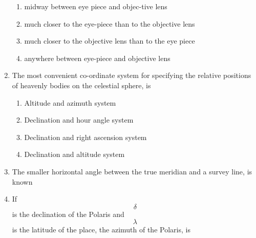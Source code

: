 \documentclass[11pt,a4paper]{article}
\begin{document}
\begin{enumerate}
\begin{enumerate}[label=\Alph*.]
\item{midway between eye piece and objec-tive lens}
\item{much closer to the eye-piece than to the objective lens}
\item{much closer to the objective lens than to the eye piece}
\item{anywhere between eye-piece and objective lens}
\end{enumerate}
\item{The most convenient co-ordinate system for specifying the relative positions of heavenly bodies on the celestial sphere, is}
\begin{enumerate}[label=\Alph*.]
\item{Altitude and azimuth system}
\item{Declination and hour angle system}
\item{Declination and right ascension system}
\item{Declination and altitude system}
\end{enumerate}
\item{The smaller horizontal angle between the true meridian and a survey line, is known}
\\
\item{If $$\delta $$ is the declination of the Polaris and $$\lambda $$ is the latitude of the place, the azimuth of the Polaris, is
}
\\

\end{enumerate}
\end{document}
